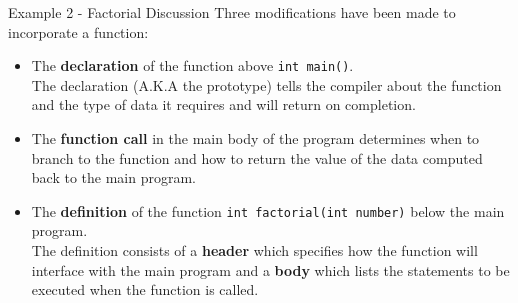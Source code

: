 \documentclass[../lecture4-functions.tex]{subfiles}
\begin{document}

\begin{frame}[fragile]{Example 2 - Factorial Discussion}
    Three modifications have been made to incorporate a function:
    \begin{itemize}
        \item The \textbf{declaration} of the function above \texttt{int main()}. \\
                The declaration (A.K.A the prototype) tells the compiler about the function and the type of data it requires and will return on completion.
        \item The \textbf{function call} in the main body of the program determines when to branch to the function and how to return the value of the data computed back to the main program.
        \item The \textbf{definition} of the function \texttt{int factorial(int number)} below the main program.\\
                The definition consists of a \textbf{header} which specifies how the function will interface with the main program and a \textbf{body} which lists the statements to be executed when the function is called.
    \end{itemize}
\end{frame}

\end{document}
